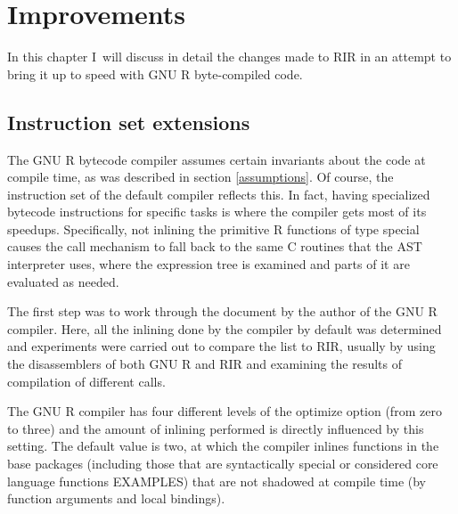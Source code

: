 \chapter{Improvements\label{improvements}}

In this chapter I~will discuss in detail the changes made to RIR in an attempt to bring it up to speed with GNU R byte-compiled code.



\section{Instruction set extensions}

The GNU R bytecode compiler assumes certain invariants about the code at compile time, as was described in section \ref{assumptions}. Of course, the instruction set of the default compiler reflects this. In fact, having specialized bytecode instructions for specific tasks is where the compiler gets most of its speedups. Specifically, not inlining the primitive R functions of type \todo[verb]special causes the call mechanism to fall back to the same C routines that the AST interpreter uses, where the expression tree is examined and parts of it are evaluated as needed.


The first step was to work through the document \autocite{compiler} by the author of the GNU R compiler. Here, all the inlining done by the compiler by default was determined and experiments were carried out to compare the list to RIR, usually by using the disassemblers of both GNU R and RIR and examining the results of compilation of different calls.


The GNU R compiler has four different levels of the \todo[verb]optimize option (from zero to three) and the amount of inlining performed is directly influenced by this setting. The default value is two, at which the compiler inlines functions in the base packages (including those that are syntactically special or considered core language functions EXAMPLES) that are not shadowed at compile time (by function arguments and local bindings).

